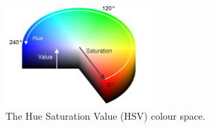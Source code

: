 
\begin{figure}[H]
	\centering
	\includegraphics[width=0.5\textwidth]{images/implementation/hsv}
	\caption[HSV]{The Hue Saturation Value (HSV) colour space. \protect\footnotemark}
	\label{fig:hsv}
\end{figure}

